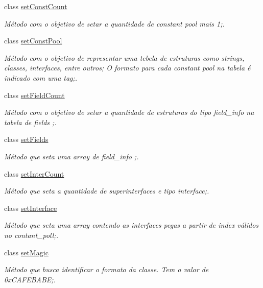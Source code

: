 \begin{DoxyCompactItemize}
class \hyperlink{class_class_loader_1_1set_const_count}{set\+Const\+Count}
\begin{DoxyCompactList}\small\item\em Método com o objetivo de setar a quantidade de constant pool mais 1;. \end{DoxyCompactList}\item 
class \hyperlink{class_class_loader_1_1set_const_pool}{set\+Const\+Pool}
\begin{DoxyCompactList}\small\item\em Método com o objetivo de representar uma tebela de estruturas como strings, classes, interfaces, entre outros; O formato para cada constant pool na tabela é indicado com uma tag;. \end{DoxyCompactList}\item 
class \hyperlink{class_class_loader_1_1set_field_count}{set\+Field\+Count}
\begin{DoxyCompactList}\small\item\em Método com o objetivo de setar a quantidade de estruturas do tipo field\+\_\+info na tabela de fields ;. \end{DoxyCompactList}\item 
class \hyperlink{class_class_loader_1_1set_fields}{set\+Fields}
\begin{DoxyCompactList}\small\item\em Método que seta uma array de field\+\_\+info ;. \end{DoxyCompactList}\item 
class \hyperlink{class_class_loader_1_1set_inter_count}{set\+Inter\+Count}
\begin{DoxyCompactList}\small\item\em Método que seta a quantidade de superinterfaces e tipo interface;. \end{DoxyCompactList}\item 
class \hyperlink{class_class_loader_1_1set_interface}{set\+Interface}
\begin{DoxyCompactList}\small\item\em Método que seta uma array contendo as interfaces pegas a partir de index válidos no contant\+\_\+poll;. \end{DoxyCompactList}\item 
class \hyperlink{class_class_loader_1_1set_magic}{set\+Magic}
\begin{DoxyCompactList}\small\item\em Método que busca identificar o formato da classe. Tem o valor de 0x\+C\+A\+F\+E\+B\+A\+BE;. \end{DoxyCompactList}\item 

\end{DoxyCompactItemize}
